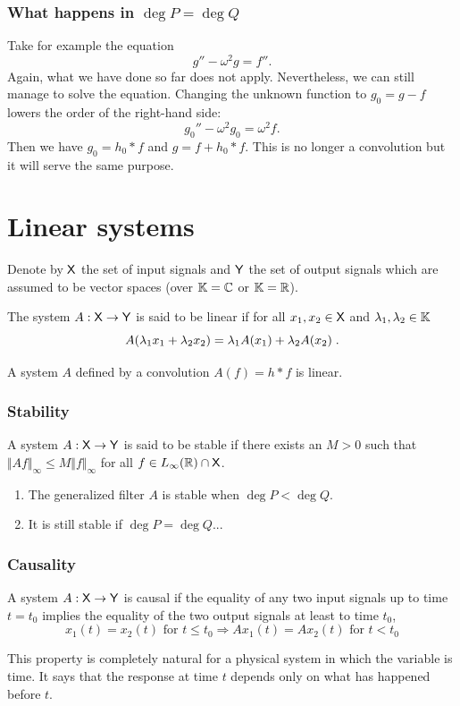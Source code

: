 \begin{frame}
\frametitle{What happens in $\deg P= \deg Q$}
Take for example the equation
$$
g''-\omega^{2}g=f''.
$$
Again, what we have done so far does not apply. Nevertheless, we can still manage to solve the equation.
Changing the unknown function to $g_0 =g-f$ lowers the order of the right-hand side:
$$
g_{0}''-\omega^{2}g_{0}=\omega^{2}f.
$$
Then we have $g_{0}=h_{0}*f$ and $g=f+h_{0}*f$.
This is \alert{no longer a convolution}  but it will serve the same purpose.
\end{frame}

\section{Linear systems}
\begin{frame}
Denote by $\mathsf{X}$ the set of \alert{input signals} and $\mathsf{Y}$ the set of \alert{output signals} which are assumed to be vector
spaces (over $\mathbb{K}=\mathbb{C}$ or $\mathbb{K}=\mathbb{R}$).
\begin{definition}[Linearity]
The system $A: \mathsf{X} \to \mathsf{Y}$ is said to be \alert{linear} if for all $x_1,x_2 \in \mathsf{X}$ and $\lambda_1,\lambda_2 \in \mathbb{K}$
$$
A(\lambda_1 x_1 + \lambda_2 x_2)= \lambda_1 A(x_1) + \lambda_2 A(x_2) \;.
$$
\end{definition}
A system $A$ defined by a convolution $A(f) = h * f$ is linear.
\end{frame}

\begin{frame}
\frametitle{Stability}
\begin{definition}
A system $A: \mathsf{X} \to \mathsf{Y}$ is said to be \alert{stable} if there exists an $M>0$ such that $\Vert Af\Vert_{\infty}\leq M\Vert f\Vert_{\infty}$ for all $f\in L_\infty(\mathbb{R})\cap \mathsf{X}$.
\end{definition}
\begin{enumerate}[label=(\roman*)]
\item The generalized filter $A$ is stable when $\deg P<\deg Q$.
\item It is still stable if $\deg P = \deg Q$...
 \end{enumerate}
\end{frame}

\begin{frame}
\frametitle{Causality}
\begin{definition}
A system $A: \mathsf{X} \to \mathsf{Y}$ is \alert{causal} if the equality of any two input signals up to time $t=t_0$ implies the equality of the two output signals at least to time $t_0$,
$$
\text{$x_1(t)= x_2(t)$ for $t \leq t_0$} \Rightarrow \text{$A x_1(t)= A x_2(t)$ for $t < t_0$}
$$
\end{definition}
This property is completely natural for a physical system in which the
variable is time. It says that the response at time $t$ depends only on what
has happened before $t$.
\end{frame}

